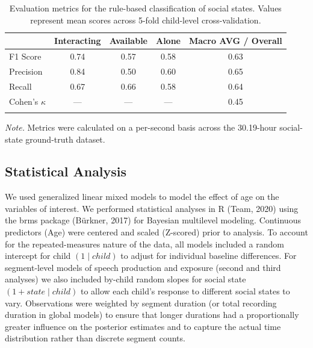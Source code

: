 \documentclass[
  english,
  12pt,
  man,floatsintext]{apa6}
\begin{document}
\begin{table}[tbp]

\begin{center}
\begin{threeparttable}

\caption{\label{tab:segments-evaluation-metrics}Evaluation metrics for the rule-based classification of social states. Values represent mean scores across 5-fold child-level cross-validation.}

\begin{tabular}{lcccc}
\toprule
  & \multicolumn{1}{c}{Interacting} & \multicolumn{1}{c}{Available} & \multicolumn{1}{c}{Alone} & \multicolumn{1}{c}{Macro AVG / Overall}\\
\midrule
F1 Score & 0.74 & 0.57 & 0.58 & 0.63\\
Precision & 0.84 & 0.50 & 0.60 & 0.65\\
Recall & 0.67 & 0.66 & 0.58 & 0.64\\
Cohen's $\kappa$ & — & — & — & 0.45\\
\bottomrule
\addlinespace
\end{tabular}

\begin{tablenotes}[para]
\normalsize{\textit{Note.} Metrics were calculated on a per-second basis across the 30.19-hour social-state ground-truth dataset.}
\end{tablenotes}

\end{threeparttable}
\end{center}

\end{table}

\subsection{Statistical Analysis}\label{statistical-analysis}

We used generalized linear mixed models to model the effect of age on the variables of interest. We performed statistical analyses in R (Team, 2020) using the brms package (Bürkner, 2017) for Bayesian multilevel modeling. Continuous predictors (Age) were centered and scaled (Z-scored) prior to analysis. To account for the repeated-measures nature of the data, all models included a random intercept for child \((1 \mid child)\) to adjust for individual baseline differences. For segment-level models of speech production and exposure (second and third analyses) we also included by-child random slopes for social state \((1 + state \mid child)\) to allow each child's response to different social states to vary. Observations were weighted by segment duration (or total recording duration in global models) to ensure that longer durations had a proportionally greater influence on the posterior estimates and to capture the actual time distribution rather than discrete segment counts.
\end{document}

